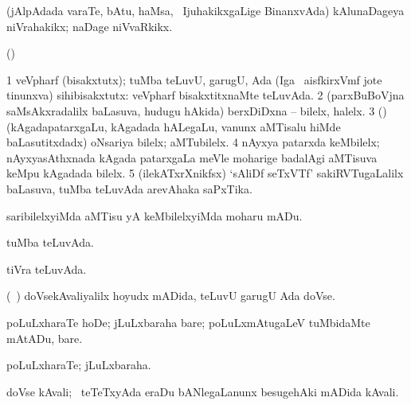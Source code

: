 \bentry
{}
\gl{\nA}
\expl{}
\bmng
(jAlpAdada varaTe, bAtu, haMsa, \mo\ IjuhakikxgaLige BinanxvAda) kAlunaDageya niVrahakikx; naDage niVvaRkikx. 
\emng
\eentry

\bentry
{} 
\gl{\nA}
\bmng
{} 
\emng
\eentry

\bentry
{}
\gl{\saMkiSx}
\expl{}
\bmng
(\ame)  
\emng
\eentry

\bentry
{}
\gl{\saMkiSx}
\expl{}
\bmng
{} 
\emng
\eentry

\bentry
{} 
\gl{\nA}
\expl{}
\bmng
\bnum
\num{1} veVpharf (bisakxtutx); tuMba teLuvU, garugU, Ada (Iga \sA\ aisfkirxVmf jote tinunxva) sihibisakxtutx:  veVpharf bisakxtitxnaMte teLuvAda. 
\num{2} (parxBuBoVjna saMsAkxradalilx baLasuva, hudugu hAkida) berxDiDxna -- bilelx, halelx. 
\num{3} (\ca) (kAgadapatarxgaLu, kAgadada hALegaLu, \mo vanunx aMTisalu hiMde baLasutitxdadx) oNsariya bilelx; aMTubilelx. 
\num{4} nAyxya patarxda keMbilelx; nAyxyasAthxnada kAgada patarxgaLa meVle moharige badalAgi aMTisuva keMpu kAgadada bilelx. 
\num{5} (ilekATxrXnikfsx) `sAliDf seTxVTf' sakiRVTugaLalilx baLasuva, tuMba teLuvAda arevAhaka saPxTika. 
\enum
\emng
\eentry

\bentry
{} 
\gl{\sakirx}
\expl{}
\bmng
saribilelxyiMda aMTisu yA keMbilelxyiMda moharu mADu. 
\emng
\eentry

\bentry
{} 
\gl{\gu}
\expl{}
\bmng
tuMba teLuvAda. 
\emng
\eentry

\bentry
{} 
\gl{\gu}
\expl{}
\bmng
tiVra teLuvAda. 
\emng
\eentry

\bentry
{} 
\gl{\nA}
\expl{}
\bmng
(\kanmu\ \ame) doVsekAvaliyalilx hoyudx mADida, teLuvU garugU Ada doVse. 
\emng
\eentry

\bentry
{} 
\gl{\akirx}
\expl{}
\bmng
poLuLxharaTe hoDe; jLuLxbaraha bare; poLuLxmAtugaLeV tuMbidaMte mAtADu, bare. 
\emng
\eentry

\bentry
{} 
\gl{\nA}
\expl{}
\bmng
poLuLxharaTe; jLuLxbaraha. 
\emng
\eentry

\bentry
{} 
\gl{\nA}
\expl{}
\bmng
doVse kAvali; \sA\ teTeTxyAda eraDu bANlegaLanunx besugehAki mADida kAvali. 
\emng
\eentry

